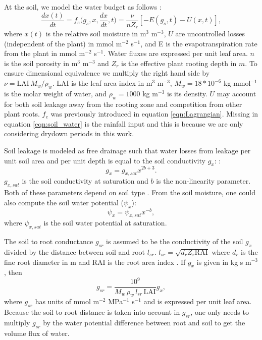 \documentclass[utf8]{frontiersSCNS} %
\begin{document}
At the soil, we model the water budget as follows \citep{Rodriguez-Iturbe2007}:
\begin{equation}
    \label{eqn:soil_water}
    \frac{dx(t)}{dt} = f_e\Big(g_s, x, \frac{dx}{dt}, t\Big) = \frac{\nu}{ n Z_r}[- E(g_s, t) - U(x, t)],
\end{equation}
where $x(t)$ is the relative soil moisture in m$^3$ m$^{-3}$, $U$ are uncontrolled losses (independent of the plant) in mmol m$^{-2}$ s$^{-1}$, and E is the evapotranspiration rate from the plant in mmol m$^{-2}$ s$^{-1}$. Water fluxes are expressed per unit leaf area. $n$ is the soil porosity in m$^3$ m$^{-3}$ and $Z_r$ is the effective plant rooting depth in $m$. To ensure dimensional equivalence we multiply the right hand side by $\nu = \text{LAI} \, M_w/ \rho_w$. LAI is the leaf area index in m$^3$ m$^{-3}$, $M_w = 18 * 10^{-6}$ kg mmol$^{-1}$ is the molar weight of water, and $\rho_w = 1000$ kg m$^{-3}$ is its density. $U$ may account for both soil leakage away from the rooting zone and competition from other plant roots. $f_e$ was previously introduced in equation \ref{eqn:Lagrangian}. Missing in equation \ref{eqn:soil_water} is the rainfall input and this is because we are only considering drydown periods in this work. 

Soil leakage is modeled as free drainage such that water losses from leakage per unit soil area and per unit depth is equal to the soil conductivity $g_x$: \citep{campbell1974}:
\begin{equation}
    \label{eqn:soil_cond}
    g_x = g_{x,sat}x^{2b+3}.
\end{equation}
$g_{x,sat}$ is the soil conductivity at saturation and $b$ is the non-linearity parameter. Both of these parameters depend on soil type \citep{Clapp1978}. From the soil moisture, one could also compute the soil water potential ($\psi_x$):
\begin{equation}
    \label{eqn:Clapp_pot}
    \psi_x = \psi_{x,sat}x^{-b},
\end{equation}
where $\psi_{x,sat}$ is the soil water potential at saturation.

The soil to root conductance $g_{sr}$ is assumed to be the conductivity of the soil $g_x$ divided by the distance between soil and root $l_{sr}$. $l_{sr} = \sqrt{d_r Z_r \text{RAI}}$ where $d_r$ is the fine root diameter in m and RAI is the root area index \citep{Manzoni2013}. If $g_x$ is given in kg s m$^{-3}$, then
\begin{equation}
    \label{eqn:soil_root}
    g_{sr} = \frac{10^9}{M_w \, \rho_w \, l_{sr} \, \text{LAI}} g_x, 
\end{equation}
where $g_{sr}$ has units of mmol m$^{-2}$ MPa$^{-1}$ s$^{-1}$ and is expressed per unit leaf area. Because the soil to root distance is taken into account in $g_{sr}$, one only needs to multiply $g_{sr}$ by the water potential difference between root and soil to get the volume flux of water.
\end{document}
